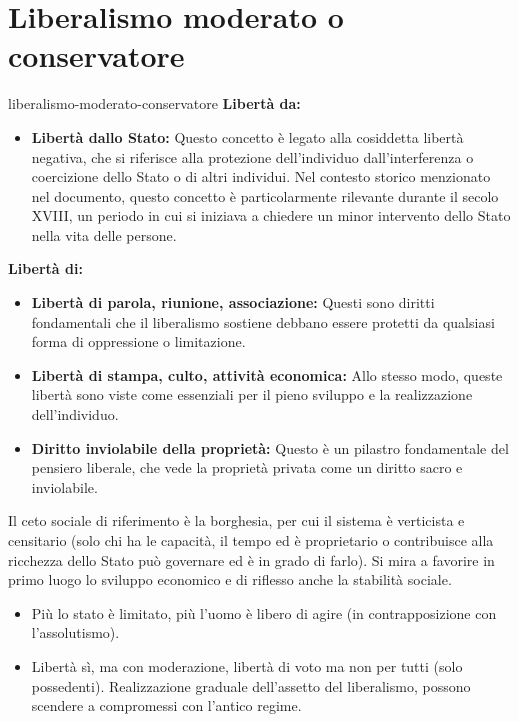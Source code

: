 \documentclass[preview]{standalone}
\begin{document}
\section{Liberalismo moderato o conservatore}

\begin{snippet}{liberalismo-moderato-conservatore}
    \textbf{Libertà da:}
    \begin{itemize}
        \item \textbf{Libertà dallo Stato:} Questo concetto è legato alla cosiddetta libertà negativa, che si riferisce alla protezione dell'individuo
            dall'interferenza o coercizione dello Stato o di altri individui.
            Nel contesto storico menzionato nel documento, questo concetto è particolarmente
            rilevante durante il secolo XVIII, un periodo in cui si iniziava
            a chiedere un minor intervento dello Stato nella vita delle persone.
    \end{itemize}

    \textbf{Libertà di:}
    \begin{itemize}
        \item \textbf{Libertà di parola, riunione, associazione:} Questi sono diritti fondamentali che il liberalismo sostiene debbano essere protetti da qualsiasi forma di oppressione o limitazione.
        \item \textbf{Libertà di stampa, culto, attività economica:} Allo stesso modo, queste libertà sono viste come essenziali per il pieno sviluppo e la realizzazione dell'individuo.
        \item \textbf{Diritto inviolabile della proprietà:} Questo è un pilastro fondamentale del pensiero liberale, che vede la proprietà privata come un diritto sacro e inviolabile.
    \end{itemize}

    Il ceto sociale di riferimento è la borghesia, per cui il sistema è verticista e censitario (solo chi
    ha le capacità, il tempo ed è proprietario o contribuisce alla ricchezza dello Stato può governare
    ed è in grado di farlo).
    Si mira a favorire in primo luogo lo sviluppo economico e di riflesso anche la stabilità sociale.

    \begin{itemize}
        \item Più lo stato è limitato, più l'uomo è libero di agire (in contrapposizione con l'assolutismo).
        \item Libertà sì, ma con moderazione, libertà di voto ma non per tutti (solo possedenti). Realizzazione graduale dell'assetto del liberalismo, possono scendere a compromessi con l'antico regime.
    \end{itemize}
\end{snippet}
\end{document}
